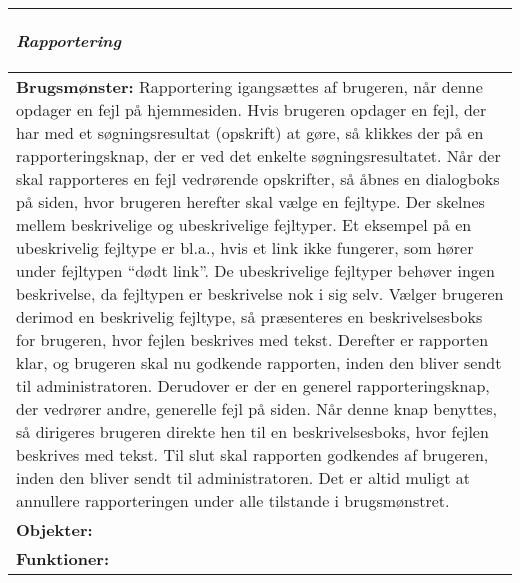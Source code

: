 \begin{tabular}{p{\textwidth}}
    \hline
    \begin{center} 
    \textbf{\textit{Rapportering}} 
    \end{center} \\ \hline
    \textbf{Brugsmønster:} Rapportering igangsættes af brugeren, når denne opdager en fejl på hjemmesiden. Hvis brugeren opdager en fejl, der har med et søgningsresultat (opskrift) at gøre, så klikkes der på en rapporteringsknap, der er ved det enkelte søgningsresultatet. Når der skal rapporteres en fejl vedrørende opskrifter, så åbnes en dialogboks på siden, hvor brugeren herefter skal vælge en fejltype. Der skelnes mellem beskrivelige og ubeskrivelige fejltyper. Et eksempel på en ubeskrivelig fejltype er bl.a., hvis et link ikke fungerer, som hører under fejltypen “dødt link”. De ubeskrivelige fejltyper behøver ingen beskrivelse, da fejltypen er beskrivelse nok i sig selv. Vælger brugeren derimod en beskrivelig fejltype, så præsenteres en beskrivelsesboks for brugeren, hvor fejlen beskrives med tekst. Derefter er rapporten klar, og brugeren skal nu godkende rapporten, inden den bliver sendt til administratoren.
Derudover er der en generel rapporteringsknap, der vedrører andre, generelle fejl på siden. Når denne knap benyttes, så dirigeres brugeren direkte hen til en beskrivelsesboks, hvor fejlen beskrives med tekst. Til slut skal rapporten godkendes af brugeren, inden den bliver sendt til administratoren. Det er altid muligt at annullere rapporteringen under alle tilstande i brugsmønstret. \\
    \textbf{Objekter:}  \\
    \textbf{Funktioner:}  \\ \hline
\end{tabular}